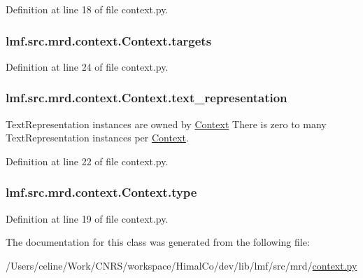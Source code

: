 Definition at line 18 of file context.\+py.

\hypertarget{classlmf_1_1src_1_1mrd_1_1context_1_1_context_a29412f9361cee534cfa7148320e0826f}{
\subsubsection[{targets}]{\setlength{\rightskip}{0pt plus 5cm}lmf.\+src.\+mrd.\+context.\+Context.\+targets}}\label{classlmf_1_1src_1_1mrd_1_1context_1_1_context_a29412f9361cee534cfa7148320e0826f}


Definition at line 24 of file context.\+py.

\hypertarget{classlmf_1_1src_1_1mrd_1_1context_1_1_context_a471cd19ef138a424df53621024979ba7}{
\subsubsection[{text\+\_\+representation}]{\setlength{\rightskip}{0pt plus 5cm}lmf.\+src.\+mrd.\+context.\+Context.\+text\+\_\+representation}}\label{classlmf_1_1src_1_1mrd_1_1context_1_1_context_a471cd19ef138a424df53621024979ba7}


Text\+Representation instances are owned by \hyperlink{classlmf_1_1src_1_1mrd_1_1context_1_1_context}{Context} There is zero to many Text\+Representation instances per \hyperlink{classlmf_1_1src_1_1mrd_1_1context_1_1_context}{Context}. 



Definition at line 22 of file context.\+py.

\hypertarget{classlmf_1_1src_1_1mrd_1_1context_1_1_context_a785d657d9be0addc379745e7efa4996b}{
\subsubsection[{type}]{\setlength{\rightskip}{0pt plus 5cm}lmf.\+src.\+mrd.\+context.\+Context.\+type}}\label{classlmf_1_1src_1_1mrd_1_1context_1_1_context_a785d657d9be0addc379745e7efa4996b}


Definition at line 19 of file context.\+py.



The documentation for this class was generated from the following file\+:\begin{DoxyCompactItemize}
\item 
/\+Users/celine/\+Work/\+C\+N\+R\+S/workspace/\+Himal\+Co/dev/lib/lmf/src/mrd/\hyperlink{context_8py}{context.\+py}\end{DoxyCompactItemize}
